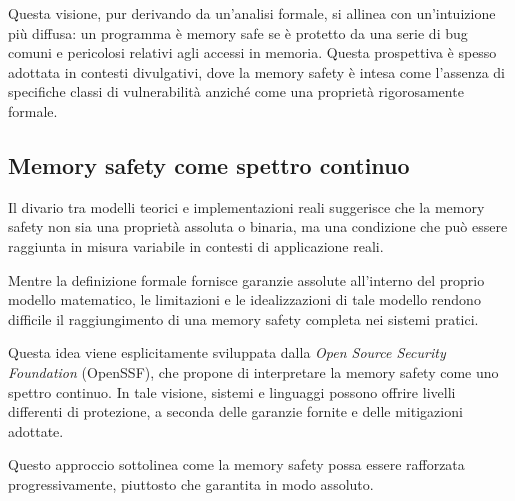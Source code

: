 Questa visione, pur derivando da un'analisi formale, si allinea con un'intuizione
più diffusa: un programma è memory safe se è protetto da una serie di bug comuni
e pericolosi relativi agli accessi in memoria. Questa prospettiva è spesso
adottata in contesti divulgativi, dove la memory safety è intesa come l'assenza di
specifiche classi di vulnerabilità anziché come una proprietà rigorosamente formale.

\subsection{Memory safety come spettro continuo}
\label{sec:continuum_definition}

Il divario tra modelli teorici e implementazioni reali suggerisce che la memory
safety non sia una proprietà assoluta o binaria, ma una condizione che può essere
raggiunta in misura variabile in contesti di applicazione reali.

Mentre la definizione formale fornisce garanzie assolute all'interno del proprio
modello matematico, le limitazioni e le idealizzazioni di tale modello rendono
difficile il raggiungimento di una memory safety completa nei sistemi pratici.

Questa idea viene esplicitamente sviluppata dalla \textit{Open Source Security
Foundation} (OpenSSF)\cite{memory_safety_continuum}, che propone di interpretare
la memory safety come uno spettro continuo. In tale visione, sistemi e linguaggi
possono offrire livelli differenti di protezione, a seconda delle garanzie
fornite e delle mitigazioni adottate.

Questo approccio sottolinea come la memory safety possa essere rafforzata
progressivamente, piuttosto che garantita in modo assoluto.